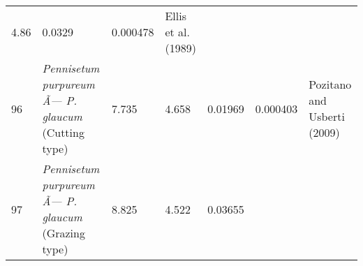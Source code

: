 \documentclass[]{article}
\begin{document}
\begin{longtable}[]{@{}lllllll@{}}
\begin{minipage}[t]{0.08\columnwidth}
4.86\strut
\end{minipage} & \begin{minipage}[t]{0.08\columnwidth}\raggedright
0.0329\strut
\end{minipage} & \begin{minipage}[t]{0.08\columnwidth}\raggedright
0.000478\strut
\end{minipage} & \begin{minipage}[t]{0.23\columnwidth}\raggedright
Ellis et al. (1989)\strut
\end{minipage}\tabularnewline
\begin{minipage}[t]{0.05\columnwidth}\raggedright
96\strut
\end{minipage} & \begin{minipage}[t]{0.23\columnwidth}\raggedright
\emph{Pennisetum purpureum Ã--- P. glaucum }(Cutting type)\strut
\end{minipage} & \begin{minipage}[t]{0.05\columnwidth}\raggedright
7.735\strut
\end{minipage} & \begin{minipage}[t]{0.08\columnwidth}\raggedright
4.658\strut
\end{minipage} & \begin{minipage}[t]{0.08\columnwidth}\raggedright
0.01969\strut
\end{minipage} & \begin{minipage}[t]{0.08\columnwidth}\raggedright
0.000403\strut
\end{minipage} & \begin{minipage}[t]{0.23\columnwidth}\raggedright
Pozitano and Usberti (2009)\strut
\end{minipage}\tabularnewline
\begin{minipage}[t]{0.05\columnwidth}\raggedright
97\strut
\end{minipage} & \begin{minipage}[t]{0.23\columnwidth}\raggedright
\emph{Pennisetum purpureum Ã--- P. glaucum }(Grazing type)\strut
\end{minipage} & \begin{minipage}[t]{0.05\columnwidth}\raggedright
8.825\strut
\end{minipage} & \begin{minipage}[t]{0.08\columnwidth}\raggedright
4.522\strut
\end{minipage} & \begin{minipage}[t]{0.08\columnwidth}\raggedright
0.03655\strut
\end{minipage} & \begin{minipage}[t]{0.08\columnwidth}\raggedright

\end{minipage}
\end{longtable}
\end{document}
